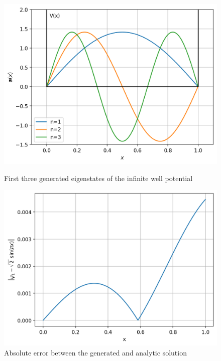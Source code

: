 \documentclass[11pt]{article}
\begin{document}
\begin{figure}[htbp]
  \begin{minipage}{.5\textwidth}
    \centering
    \includegraphics*[width=0.851\linewidth]{ex_eigenstates1.png}
    \captionsetup{width=0.9\textwidth}
    \vspace{-.3cm}
    \caption{First three generated eigenstates of the infinite well potential}
  \end{minipage}%
  \begin{minipage}{0.5\textwidth}
    \centering
    \includegraphics*[width=0.85\linewidth]{error_sin.png}
    \captionsetup{width=0.9\textwidth}
    \vspace{-.3cm}
    \caption{Absolute error between the generated and analytic solution}
  \end{minipage}
\end{figure}
\end{document}
